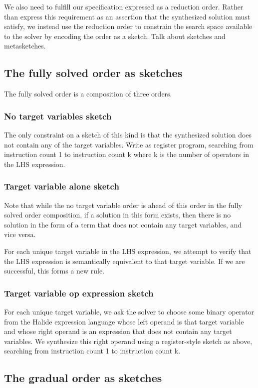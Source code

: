 We also need to fulfill our specification expressed as a reduction order. Rather than express this requirement as an assertion that the synthesized solution must satisfy, we instead use the reduction order to constrain the search space available to the solver by encoding the order as a sketch. Talk about sketches and metasketches.

\subsection{The fully solved order as sketches}

The fully solved order is a composition of three orders.

\subsubsection{No target variables sketch}
The only constraint on a sketch of this kind is that the synthesized solution does not contain any of the target variables. Write as register program, searching from instruction count 1 to instruction count k where k is the number of operators in the LHS expression.

\subsubsection{Target variable alone sketch}
Note that while the no target variable order is ahead of this order in the fully solved order composition, if a solution in this form exists, then there is no solution in the form of a term that does not contain any target variables, and vice versa. 

For each unique target variable in the LHS expression, we attempt to verify that the LHS expression is semantically equivalent to that target variable. If we are successful, this forms a new rule.

\subsubsection{Target variable op expression sketch}
For each unique target variable, we ask the solver to choose some binary operator from the Halide expression language whose left operand is that target variable and whose right operand is an expression that does not contain any target variables. We synthesize this right operand using a register-style sketch as above, searching from instruction count 1 to instruction count k.

\subsection{The gradual order as sketches}

